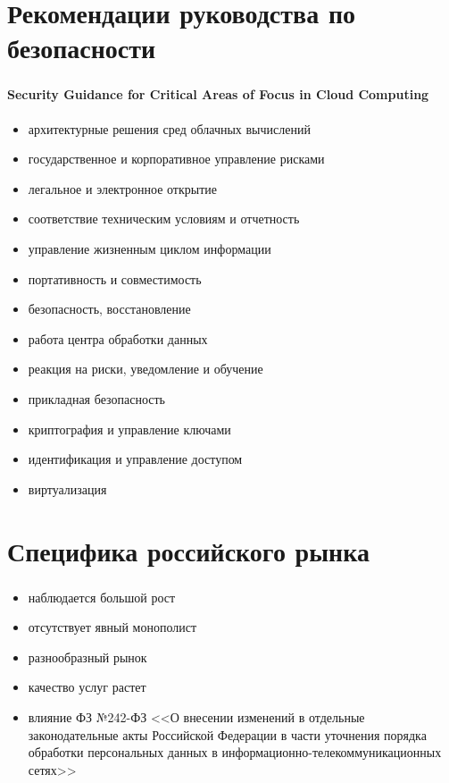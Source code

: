 
\section{Рекомендации руководства по безопасности}

\begin{frame}
\frametitle{\insertsection}
\framesubtitle{Security Guidance for Critical Areas of Focus in Cloud Computing}

\begin{itemize}
    \item архитектурные решения сред облачных вычислений
    \item государственное и корпоративное управление рисками
    \item легальное и электронное открытие
    \item соответствие техническим условиям и отчетность
    \item управление жизненным циклом информации
    \item портативность и совместимость
    \item безопасность, восстановление
    \item работа центра обработки данных
    \item реакция на риски, уведомление и обучение
    \item прикладная безопасность
    \item криптография и управление ключами
    \item идентификация и управление доступом
    \item виртуализация
\end{itemize}
\end{frame}


\section{Специфика российского рынка}

\begin{frame}
\frametitle{\insertsection}
\begin{itemize}
    \item наблюдается большой рост
    \item отсутствует явный монополист
    \item разнообразный рынок
    \item качество услуг растет
    \item влияние ФЗ №242-ФЗ <<О внесении изменений в отдельные законодательные акты Российской Федерации в части уточнения порядка обработки персональных данных в информационно-телекоммуникационных сетях>>
\end{itemize}
\end{frame}

